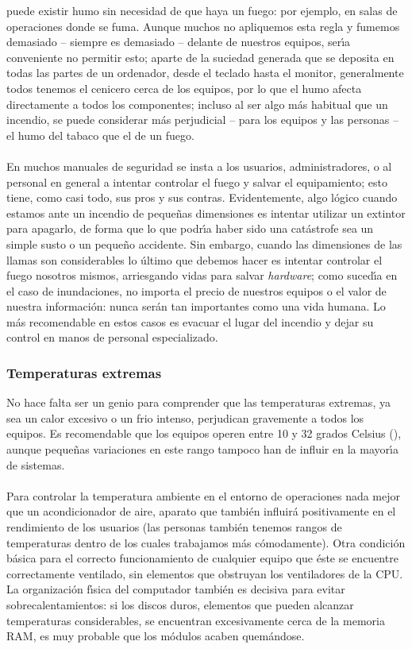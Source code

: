 puede existir humo sin necesidad de que haya un fuego: por ejemplo, en salas
de operaciones donde se fuma. Aunque muchos no apliquemos esta regla y fumemos
demasiado -- siempre es demasiado -- delante de nuestros equipos, ser\'{\i}a
conveniente no permitir esto; aparte de la suciedad generada que se deposita
en todas las partes de un ordenador, desde el teclado hasta el monitor, 
generalmente todos tenemos el cenicero cerca de los equipos, por lo que el
humo afecta directamente a todos los componentes; incluso al ser algo m\'as
habitual que un incendio, se puede considerar m\'as perjudicial -- para los
equipos y las personas -- el humo del tabaco que el de un fuego.\\
\\En muchos manuales de seguridad se insta a los usuarios, administradores, o
al personal en general a intentar controlar el fuego y salvar el equipamiento;
esto tiene, como casi todo, sus pros y sus contras. Evidentemente, algo
l\'ogico cuando estamos ante un incendio de peque\~nas dimensiones es intentar
utilizar un extintor para apagarlo, de forma que lo que podr\'{\i}a haber sido
una cat\'astrofe sea un simple susto o un peque\~no accidente. Sin embargo, 
cuando las dimensiones de las llamas son considerables lo \'ultimo que debemos
hacer es intentar controlar el fuego nosotros mismos, arriesgando vidas para
salvar {\it hardware}; como suced\'{\i}a en el caso de inundaciones, no 
importa el precio de nuestros equipos o el valor de nuestra informaci\'on:
nunca ser\'an tan importantes como una vida humana. Lo m\'as recomendable en
estos casos es evacuar el lugar del incendio y dejar su control en manos de
personal especializado.
\subsubsection{Temperaturas extremas}
No hace falta ser un genio para comprender que las temperaturas extremas, ya
sea un calor excesivo o un frio intenso, perjudican gravemente a todos los
equipos. Es recomendable que los equipos operen entre 10 y 32 grados Celsius
(\cite{kn:spa96}), aunque peque\~nas variaciones en este rango tampoco han de
influir en la mayor\'{\i}a de sistemas.\\
\\Para controlar la temperatura ambiente en el entorno de operaciones nada
mejor que un acondicionador de aire, aparato que tambi\'en influir\'a 
positivamente en el rendimiento de los usuarios (las personas tambi\'en tenemos
rangos de temperaturas dentro de los cuales trabajamos m\'as c\'omodamente).
Otra condici\'on b\'asica para el correcto funcionamiento de cualquier equipo 
que \'este se encuentre correctamente ventilado, sin elementos que obstruyan los
ventiladores de la CPU. La organizaci\'on f\'{\i}sica del computador tambi\'en
es decisiva para evitar sobrecalentamientos: si los discos duros, elementos
que pueden alcanzar temperaturas considerables, se encuentran excesivamente 
cerca de la memoria RAM, es muy probable que los m\'odulos acaben 
quem\'andose.
